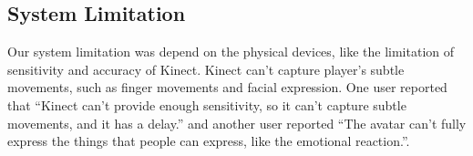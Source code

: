 \subsection{System Limitation}

	Our system limitation was depend on the physical devices, like the limitation of sensitivity and accuracy of Kinect. Kinect can't capture player's subtle movements, such as finger movements and facial expression. One user reported that ``Kinect can't provide enough sensitivity, so it can't capture subtle movements, and it has a delay.'' and 
	another user reported ``The avatar can't fully express the things that people can express, like the emotional reaction.''.





